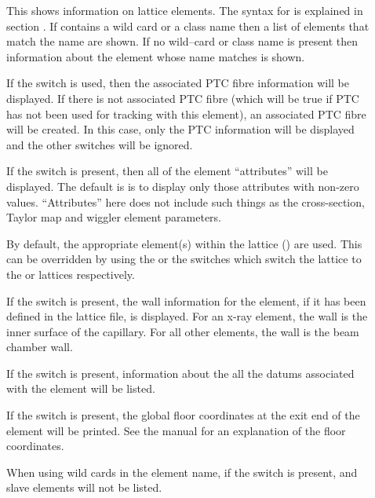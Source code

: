 {{{\begin{description}
\item[\protect\parbox{6in}{
  show element \{-attributes\} \{-base\} \{-data\} \{-design\} \{-all\} \{-field\} \\
  \hspace*{0.35in} \{-floor_coords\} \{-no_slaves\} \{-ptc\} \{-taylor\} \{-wall\} \{-xfer_mat\} <ele\_name> }] \Newline

\vskip -0.1in

This shows information on lattice elements. The syntax for  
is explained in section . If
 contains a wild card or a class name then a list of
elements that match the name are shown. If no wild--card or class name
is present then information about the element whose name matches
 is shown.

If the  switch is used, then the associated PTC fibre
information will be displayed. If there is not associated PTC fibre
(which will be true if PTC has not been used for tracking with this
element), an associated PTC fibre will be created. In this case, only
the PTC information will be displayed and the other switches will be
ignored.

If the  switch is present, then all of the element ``attributes''
will be displayed. The default is is to display only those attributes
with non-zero values. ``Attributes'' here does not include such things as
the cross-section, Taylor map and wiggler element parameters.

By default, the appropriate element(s) within the  lattice
() are used. This can be overridden by using the
 or the  switches which switch the lattice to
the  or  lattices respectively.

If the  switch is present, the wall information for the
element, if it has been defined in the lattice file, is displayed. For
an x-ray  element, the wall is the inner surface of the
capillary. For all other elements, the wall is the beam chamber wall.

If the  switch is present, information about the 
all the datums associated with the element will be listed. 

If the  switch is present, the global
floor coordinates at the exit end of the element will
be printed. See the \bmad manual for an explanation
of the floor coordinates.

When using wild cards in the element name, if the 
switch is present,  and  slave elements
will not be listed.


\end{description}}}}
